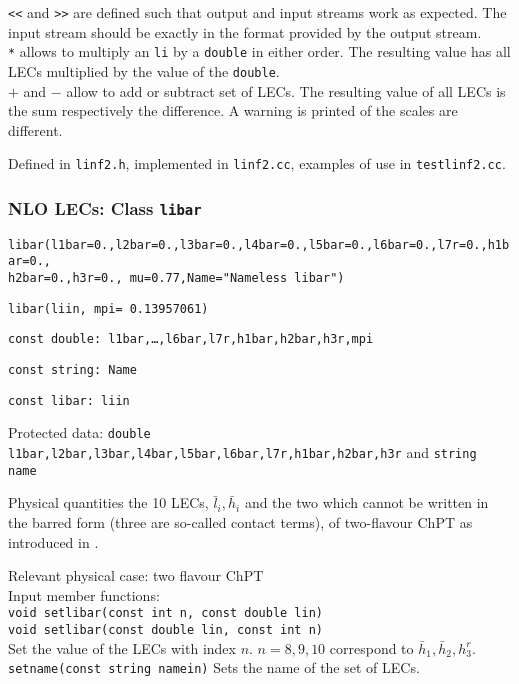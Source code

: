 \documentclass[12pt,a4paper]{article}
\newcommand{\mytt}[1]{\texttt{#1}}
\newcommand{\newfunction}[1]{\mytt{#1}\index{\mytt{#1}}}
\begin{document}
\mytt{<<} and \mytt{>>} are  defined such that output and input
streams work as expected. The input stream should be exactly in the format
provided by the output stream.\\
\mytt{*} allows to multiply an \mytt{li} by a \mytt{double} in either order.
The resulting value has all LECs multiplied by the value of the \mytt{double}.\\
\mytt{$+$} and \mytt{$-$} allow to add or subtract set of LECs.
The resulting value of all LECs is the sum respectively the difference.
A warning is printed of the scales are different.

Defined in \mytt{linf2.h}, implemented in \mytt{linf2.cc},
examples of use in \mytt{testlinf2.cc}.

\subsubsection{NLO LECs: Class \newfunction{libar}}


\mytt{libar(l1bar=0.,l2bar=0.,l3bar=0.,l4bar=0.,l5bar=0.,l6bar=0.,l7r=0.,h1bar=0.,\\\hspace*{0.7cm}h2bar=0.,h3r=0.,
mu=0.77,Name="Nameless libar")}

\mytt{libar(liin, mpi= 0.13957061)}

\mytt{const double: l1bar,\ldots,l6bar,l7r,h1bar,h2bar,h3r,mpi}

\mytt{const string: Name}

\mytt{const libar: liin}

Protected data: \mytt{double l1bar,l2bar,l3bar,l4bar,l5bar,l6bar,l7r,h1bar,h2bar,h3r}
and \mytt{string name}

Physical quantities the 10 LECs, $\bar l_i,\bar h_i$ and the two which cannot be
written in the barred form
(three are so-called contact terms),
of two-flavour ChPT as introduced in \cite{Gasser:1983yg}.

Relevant physical case: two flavour ChPT\\

Input member functions:\\
\mytt{void \newfunction{setlibar}(const int n, const double lin)}\\
\mytt{void setlibar(const double lin, const int n)}\\
Set the value of the LECs with index $n$. $n=8,9,10$ correspond to
$\bar h_1,\bar h_2,h_3^r$.\\

\mytt{\newfunction{setname}(const string namein)}
Sets the name of the set of LECs.\\
\end{document}
